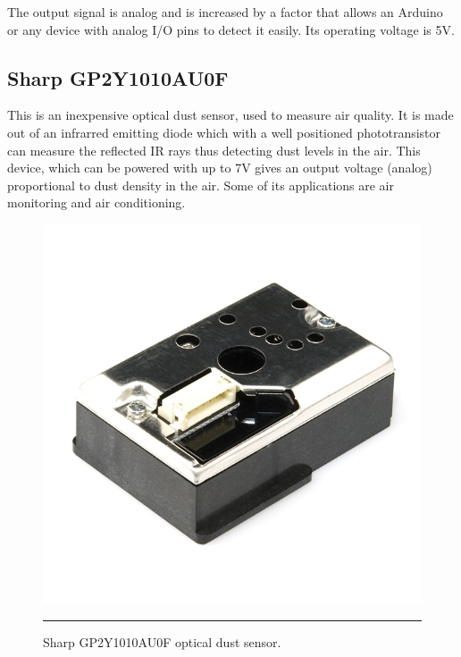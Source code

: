 The output signal is analog and is increased by a factor that allows an Arduino or any device with analog I/O pins to detect it easily\citep{gertz2012environmental}. Its operating voltage is 5V.



\subsection{Sharp GP2Y1010AU0F}

This is an inexpensive optical dust sensor, used to measure air quality. It is made out of an infrarred emitting diode which with a well positioned phototransistor can measure the reflected IR rays thus detecting dust levels in the air\citep{sharp}. This device, which can be powered with up to 7V gives an output voltage (analog) proportional to dust density in the air. Some of its applications are air monitoring and air conditioning.

\begin{figure}[htbp]
    \centering
        \includegraphics{./Figures/sharp.jpg}
        \rule{35em}{0.5pt}
    \caption[Sharp GP2Y1010AU0F]{Sharp GP2Y1010AU0F optical dust sensor.}
    \label{fig:SharpGP2Y1010AU0F}
\end{figure}

